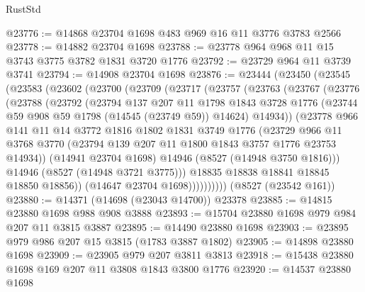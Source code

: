 \begin{lexlean}{RustStd}
\begin{coremodule}
@23776 := @14868 @23704 @1698 @483 @969 @16 @11 @3776 @3783 @2566
@23778 := @14882 @23704 @1698
@23788 := @23778 @964 @968 @11 @15 @3743 @3775 @3782 @1831 @3720 @1776
@23792 := @23729 @964 @11 @3739 @3741
@23794 := @14908 @23704 @1698
@23876 := @23444
    (@23450
      (@23545
        (@23583
          (@23602
            (@23700
              (@23709
                (@23717
                  (@23757
                    (@23763
                      (@23767
                        (@23776
                          (@23788
                            (@23792
                              (@23794
                                @137
                                @207
                                @11
                                @1798
                                @1843
                                @3728
                                @1776
                                (@23744 @59 @908 @59 @1798 (@14545 (@23749 @59)) @14624)
                                @14934))
                            (@23778
                              @966
                              @141
                              @11
                              @14
                              @3772
                              @1816
                              @1802
                              @1831
                              @3749
                              @1776
                              (@23729
                                @966
                                @11
                                @3768
                                @3770
                                (@23794 @139 @207 @11 @1800 @1843 @3757 @1776 @23753 @14934))
                              (@14941 @23704 @1698)
                              @14946
                              (@8527 (@14948 @3750 @1816)))
                            @14946
                            (@8527 (@14948 @3721 @3775)))
                          @18835
                          @18838
                          @18841
                          @18845
                          @18850
                          @18856))
                      (@14647 @23704 @1698))))))))))
    (@8527 (@23542 @161))
@23880 := @14371 (@14698 (@23043 @14700)) @23378
@23885 := @14815 @23880 @1698 @988 @908 @3888
@23893 := @15704 @23880 @1698 @979 @984 @207 @11 @3815 @3887
@23895 := @14490 @23880 @1698
@23903 := @23895 @979 @986 @207 @15 @3815 (@1783 @3887 @1802)
@23905 := @14898 @23880 @1698
@23909 := @23905 @979 @207 @3811 @3813
@23918 := @15438 @23880 @1698 @169 @207 @11 @3808 @1843 @3800 @1776
@23920 := @14537 @23880 @1698

\end{coremodule}
\end{lexlean}
